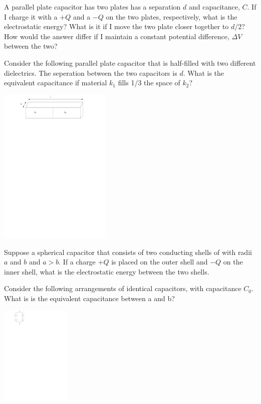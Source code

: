 \documentclass[12pt]{article}
\begin{document}
\pagestyle{empty}

\noindent A parallel plate capacitor has two plates has a separation $d$ and capacitance, $C$.  If I charge it with a $+Q$ and a $-Q$ on the two plates, respectively, what is the electrostatic energy? What is it if I move the two plate closer together to $d/2$?  How would the answer differ if I maintain a constant potential difference, $\Delta V$ between the two?

\newpage

\noindent Consider the following parallel plate capacitor that is half-filled with two different dielectrics.  The seperation between the two capacitors is $d$.  What is the equivalent capacitance if material $k_1$ fills 1/3 the space of $k_2$?

\includegraphics[width=0.4\textwidth]{two-dielectric.pdf}

\newpage 


\noindent Suppose a spherical capacitor that consists of two conducting shells of with radii $a$ and $b$ and $a > b$. If a charge $+Q$ is placed on the outer shell and $-Q$ on the inner shell, what is the electrostatic energy between the two shells.  

\newpage 

\noindent Consider the following arrangements of identical capacitors, with capacitance $C_0$.  What is is the equivalent capacitance between a and b?

\includegraphics[width=0.25\textwidth]{capacitor-circuit.pdf}
\end{document}
